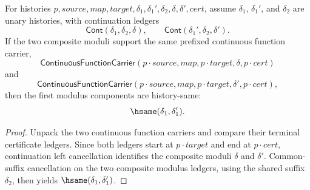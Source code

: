 \begin{theorem}
\label{thm:continuous-function-carrier-prefixed-graph-chain-first-deterministic}
For histories $p,source,map,target,\delta_1,\delta_1',\delta_2,\delta,
\delta',cert$, assume $\delta_1$, $\delta_1'$, and $\delta_2$ are unary
histories, with continuation ledgers
$$
\mathsf{Cont}(\delta_1,\delta_2,\delta),
\qquad
\mathsf{Cont}(\delta_1',\delta_2,\delta').
$$
If the two composite moduli support the same prefixed continuous function
carrier,
$$
\mathsf{ContinuousFunctionCarrier}(p\cdot source,map,p\cdot target,\delta,p\cdot cert)
$$
and
$$
\mathsf{ContinuousFunctionCarrier}(p\cdot source,map,p\cdot target,\delta',p\cdot cert),
$$
then the first modulus components are history-same:
$$
\hsame(\delta_1,\delta_1').
$$
\end{theorem}
\begin{proof}
Unpack the two continuous function carriers and compare their terminal
certificate ledgers. Since both ledgers start at $p\cdot target$ and end at
$p\cdot cert$, continuation left cancellation identifies the composite moduli
$\delta$ and $\delta'$. Common-suffix cancellation on the two composite
modulus ledgers, using the shared suffix $\delta_2$, then yields
$\hsame(\delta_1,\delta_1')$.
\end{proof}

